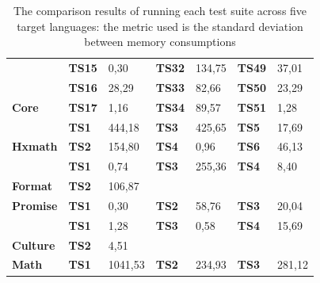 \begin{table}[]
{\begin{tabular}{|l|l|l|l|l|l|l|}
		& \textbf{TS15}      & 0,30                            & \textbf{TS32}      & 134,75                         & \textbf{TS49}      & 37,01                          \\ \cline{2-7} 
		& \textbf{TS16}      & 28,29                           & \textbf{TS33}      & 82,66                          & \textbf{TS50}      & 23,29                          \\ \cline{2-7} 
		\multirow{-17}{*}{\textbf{Core}}            & \textbf{TS17}      & 1,16                            & \textbf{TS34}      & 89,57                          & \textbf{TS51}      & 1,28                           \\ \hline
		& \textbf{TS1}       & \cellcolor[HTML]{C0C0C0}444,18  & \textbf{TS3}       & \cellcolor[HTML]{C0C0C0}425,65 & \textbf{TS5}       & 17,69                          \\ \cline{2-7} 
		\multirow{-2}{*}{\textbf{Hxmath}}  & \textbf{TS2}       & 154,80                          & \textbf{TS4}       & 0,96                           & \textbf{TS6}       & 46,13                          \\ \hline
		& \textbf{TS1}       & 0,74                            & \textbf{TS3}       & 255,36                         & \textbf{TS4}       & 8,40                           \\ \cline{2-7} 
		\multirow{-2}{*}{\textbf{Format}}  & \textbf{TS2}       & 106,87                          & \multicolumn{4}{l|}{\textbf{}}                                                                            \\ \hline
		\textbf{Promise}                   & \textbf{TS1}       & 0,30                            & \textbf{TS2}       & 58,76                          & \textbf{TS3}       & 20,04                          \\ \hline
		& \textbf{TS1}       & 1,28                            & \textbf{TS3}       & 0,58                           & \textbf{TS4}       & 15,69                          \\ \cline{2-7} 
		\multirow{-2}{*}{\textbf{Culture}} & \textbf{TS2}       & 4,51                            & \multicolumn{4}{l|}{}                                                                                     \\ \hline
		\textbf{Math}                      & \textbf{TS1}       & \cellcolor[HTML]{C0C0C0}1041,53 & \textbf{TS2}       & 234,93                         & \textbf{TS3}       & 281,12                         \\ \hline
	\end{tabular}%
}
 
	\caption{The comparison results of running each test suite across five target languages: the metric used is the standard deviation between memory consumptions}
 
 

	\label{my-label}
\end{table}



